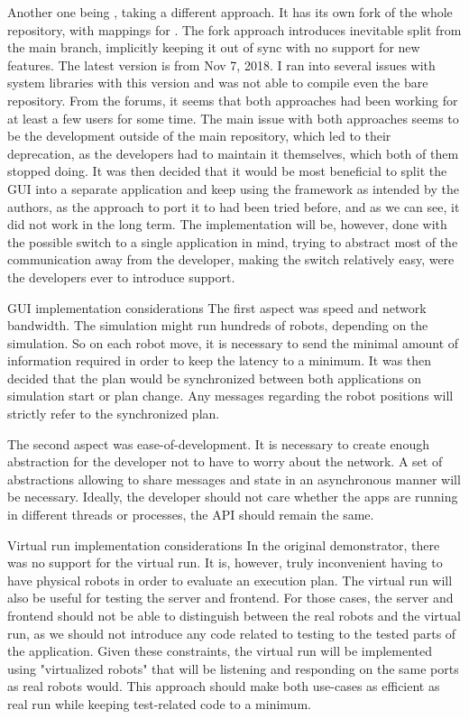 Another one being {\ofnode}, taking a different approach. It has its own fork of the whole {\of} repository, with mappings for {\cmake}. The fork approach introduces inevitable split from the main branch, implicitly keeping it out of sync with no support for new features. \br
The latest version is from Nov 7, 2018. I ran into several issues with system libraries with this version and was not able to compile even the bare repository.\br\br
From the forums, it seems that both approaches had been working for at least a few users for some time. The main issue with both approaches seems to be the development outside of the main repository, which led to their deprecation, as the developers had to maintain it themselves, which both of them stopped doing.
It was then decided that it would be most beneficial to split the GUI into a separate application and keep using the framework as intended by the authors, as the approach to port it to {\cmake} had been tried before, and as we can see, it did not work in the long term.\br\br
The implementation will be, however, done with the possible switch to a single application in mind, trying to abstract most of the communication away from the developer, making the switch relatively easy, were the developers ever to introduce {\cmake} support.

\sec GUI implementation considerations
The first aspect was speed and network bandwidth. The simulation might run hundreds of robots, depending on the simulation. So on each robot move, it is necessary to send the minimal amount of information required in order to keep the latency to a minimum. 
It was then decided that the plan would be synchronized between both applications on simulation start or plan change. Any messages regarding the robot positions will strictly refer to the synchronized plan.

The second aspect was ease-of-development. It is necessary to create enough abstraction for the developer not to have to worry about the network. A set of abstractions allowing to share messages and state in an asynchronous manner will be necessary. Ideally, the developer should not care whether the apps are running in different threads or processes, the API should remain the same.

\sec Virtual run implementation considerations
In the original demonstrator, there was no support for the virtual run. It is, however, truly inconvenient having to have physical robots in order to evaluate an execution plan. The virtual run will also be useful for testing the server and frontend. For those cases, the server and frontend should not be able to distinguish between the real robots and the virtual run, as we should not introduce any code related to testing to the tested parts of the application. Given these constraints, the virtual run will be implemented using "virtualized robots" that will be listening and responding on the same ports as real robots would. This approach should make both use-cases as efficient as real run while keeping test-related code to a minimum.

